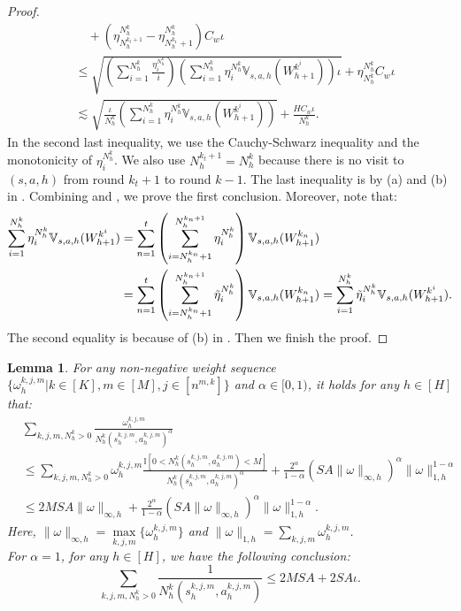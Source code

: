 \documentclass{article}
\newtheorem{lemma}{Lemma}[section]
\begin{document}
\begin{proof}
\begin{align}
        &\quad + \left(\eta_{N_h^{k_t+1}}^{N_h^k}-\eta_{N_h^{k_1}+1}^{N_h^k}\right)C_w\iota \nonumber\\
        &\leq \sqrt{\left(\sum_{i=1} ^{N_h^k}\frac{\eta_i^{N_h^k}}{i}\right)\left(\sum_{i=1} ^{N_h^k}\eta_i^{N_h^k}\mathbb{V}_{s,a,h}(W_{h+1}^{k^i})\right)\iota} + \eta_{N_h^{k}}^{N_h^k}C_w\iota \nonumber\\
        &\lesssim \sqrt{\frac{\iota}{N_h^k}\left(\sum_{i=1} ^{N_h^k}\eta_i^{N_h^k}\mathbb{V}_{s,a,h}(W_{h+1}^{k^i})\right)} + \frac{HC_w\iota}{N_h^k}.
    \end{align}
    In the second last inequality, we use the Cauchy-Schwarz inequality and the monotonicity of $\eta_i^{N_h^k}$. We also use $N_h^{k_t+1} = N_h^k$ because there is no visit to $(s,a,h)$ from round $k_t+1$ to round $k-1$. The last inequality is by (a) and (b) in . Combining  and , we prove the first conclusion. Moreover, note that:
        \begin{align*}
        \sum_{i=1} ^{N_h^k}\eta_i^{N_h^k}\mathbb{V}_{s,a,h}(W_{h+1}^{k^i}) &= \sum_{n=1}^{t}\left(\sum_{i=N_h^{k_n}+1}^{N_h^{k_n+1}}\eta_i^{N_h^k}\right)\mathbb{V}_{s,a,h}(W_{h+1}^{k_n}) \\
        &= \sum_{n=1}^{t}\left(\sum_{i=N_h^{k_n}+1}^{N_h^{k_n+1}}\Tilde{\eta}_i^{N_h^k}\right)\mathbb{V}_{s,a,h}(W_{h+1}^{k_n}) = \sum_{i=1} ^{N_h^k}\Tilde{\eta}_i^{N_h^k}\mathbb{V}_{s,a,h}(W_{h+1}^{k^i}).
    \end{align*}
The second equality is because of (b) in . Then we finish the proof.
\end{proof}
\begin{lemma}
\label{wN} For any non-negative weight sequence $\{\omega_{h}^{k, j, m}|k \in [K], m \in [M], j \in [n^{m,k}]\}$ and $\alpha \in [0,1)$, it holds for any $h \in [H]$ that:
\begin{align*}
    &\sum_{k,j,m,N_h^k >0}\frac{\omega_{h}^{k, j, m}}{N_h^k(s_h^{k,j,m},a_h^{k,j,m})^{\alpha}} \\
    &\leq \sum_{k,j,m,N_h^k >0}\omega_{h}^{k, j, m}\frac{\mathbb{I}\left[ 0<N_h^k(s_h^{k,j,m},a_h^{k,j,m})< M\right]}{N_h^k(s_h^{k,j,m},a_h^{k,j,m})^{\alpha}}+\frac{2^\alpha}{1-\alpha}(SA\|\omega\|_{\infty,h})^\alpha \|\omega\|_{1,h}^{1-\alpha}\\
    &\leq 2MSA\|\omega\|_{\infty,h}+\frac{2^\alpha}{1-\alpha}(SA\|\omega\|_{\infty,h})^\alpha \|\omega\|_{1,h}^{1-\alpha}.
\end{align*}
Here, $\|\omega\|_{\infty,h} = \mathop{\max}\limits_{k,j,m}\{\omega_{h}^{k, j, m}\}$ and $\|\omega\|_{1,h} = \sum_{k,j,m}\omega_{h}^{k, j, m}$.\\
For $\alpha = 1$, for any $h \in [H]$, we have the following conclusion:
\begin{equation*}
    \sum_{k,j,m,N_h^k >0}\frac{1}{N_h^k(s_h^{k,j,m},a_h^{k,j,m})} \leq 2MSA + 2SA\iota.
\end{equation*}
\end{lemma}
\end{document}
